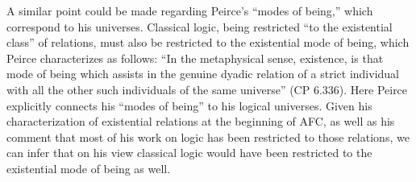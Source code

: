 A similar point could be made regarding Peirce's ``modes of being,'' which correspond to his universes. Classical logic, being restricted ``to the existential class'' of relations, must also be restricted to the existential mode of being, which Peirce characterizes as follows: ``In the metaphysical sense, existence, is that mode of being which assists in the genuine dyadic relation of a strict individual with all the other such individuals of the same universe'' (CP 6.336). Here Peirce explicitly connects his ``modes of being'' to his logical universes. Given his characterization of existential relations at the beginning of AFC, as well as his comment that most of his work on logic has been restricted to those relations, we can infer that on his view classical logic would have been restricted to the existential mode of being as well. 

